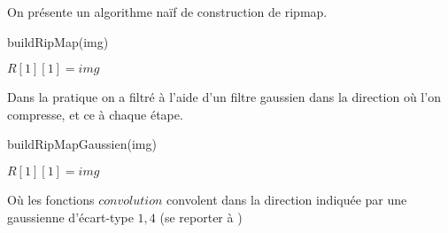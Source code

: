 
On présente un algorithme naïf de construction de ripmap.
\medbreak
\medbreak
\begin{algorithm}[H]
\caption{buildRipMap(img)}
$R[1][1] = img$\;

\end{algorithm}
\medbreak
\medbreak
Dans la pratique on a filtré à l'aide d'un filtre gaussien dans la direction où l'on compresse, et ce à chaque étape.
\medbreak
\medbreak
\begin{algorithm}[H]
\caption{buildRipMapGaussien(img)}
$R[1][1] = img$\;

\end{algorithm}
\medbreak
\medbreak
Où les fonctions $convolution$ convolent dans la direction indiquée par une gaussienne d'écart-type $1,4$ (se reporter à \cite{morel2011sift})


